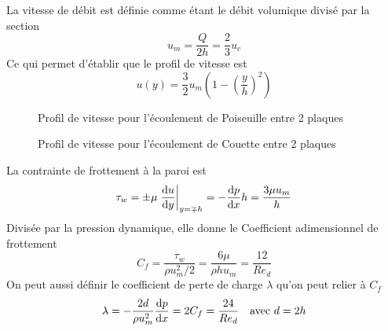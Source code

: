         La vitesse de débit est définie comme étant le débit volumique divisé par la section
        \begin{equation}
          u_m = \frac{Q}{2h} = \frac{2}{3} u_c
        \end{equation}
        Ce qui permet d'établir que le profil de vitesse est
        \begin{equation}
          u(y) = \frac{3}{2} u_m \left(1-\left(\frac{y}{h}\right)^2\right)
        \end{equation}

        \begin{figure}[h]
          \centering
          \begin{minipage}[c]{0.45\textwidth}
            
            \caption{Profil de vitesse pour l'écoulement de Poiseuille entre 2 plaques}
            \label{fig:PoiseuilleProfile}
          \end{minipage}
          \begin{minipage}[c]{0.45\textwidth}
            
            \caption{Profil de vitesse pour l'écoulement de Couette entre 2 plaques}
            \label{fig:CouetteProfile}
          \end{minipage}
        \end{figure}

        La contrainte de frottement à la paroi est
        \begin{equation}
          \tau_w = \pm \mu \eval{\dv{u}{y}}_{y=\mp h} = -\dv{p}{x} h = \frac{3\mu u_m}{h}
        \end{equation}
        Divisée par la pression dynamique, elle donne le Coefficient adimensionnel de frottement
        \begin{equation}
          C_f = \frac{\tau_w}{\rho u_m^2/2} = \frac{6\mu}{\rho h u_m} = \frac{12}{Re_d}
        \end{equation}
        On peut aussi définir le coefficient de perte de charge $\lambda$ qu'on peut relier à $C_f$
        \begin{equation}
          \lambda = -\frac{2d}{\rho u_m^2}\dv{p}{x} = 2 C_f = \frac{24}{Re_d} \quad \textrm{avec } d = 2h
        \end{equation}

